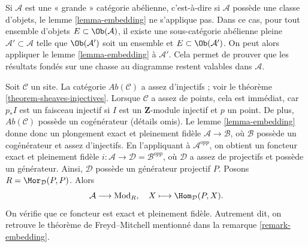 \begin{remark}
\label{remark-embedding-big}
Si $\mathcal{A}$ est une « grande » catégorie abélienne, c'est-à-dire si
$\mathcal{A}$ possède une classe d'objets, le lemme \ref{lemma-embedding} ne
s'applique pas. Dans ce cas, pour tout ensemble d'objets
$E \subset \Ob(\mathcal{A})$, il existe une sous-catégorie abélienne pleine
$\mathcal{A}' \subset \mathcal{A}$ telle que $\Ob(\mathcal{A}')$ soit un
ensemble et $E \subset \Ob(\mathcal{A}')$. On peut alors appliquer le
lemme \ref{lemma-embedding} à $\mathcal{A}'$. Cela permet de prouver que les
résultats fondés sur une chasse au diagramme restent valables dans
$\mathcal{A}$.
\end{remark}

\begin{remark}
\label{remark-embedding-freyd}
Soit $\mathcal{C}$ un site. La catégorie $\textit{Ab}(\mathcal{C})$ a assez
d'injectifs ; voir le théorème \ref{theorem-sheaves-injectives}. Lorsque
$\mathcal{C}$ a assez de points, cela est immédiat, car $p_*I$ est un faisceau
injectif si $I$ est un $\mathbf{Z}$-module injectif et $p$ un point. De plus,
$\textit{Ab}(\mathcal{C})$ possède un cogénérateur (détails omis). Le
lemme \ref{lemma-embedding} donne donc un plongement exact et pleinement fidèle
$\mathcal{A} \to \mathcal{B}$, où $\mathcal{B}$ possède un cogénérateur et
assez d'injectifs. En l'appliquant à $\mathcal{A}^{opp}$, on obtient un foncteur
exact et pleinement fidèle
$i : \mathcal{A} \to \mathcal{D} = \mathcal{B}^{opp}$, où $\mathcal{D}$ a
assez de projectifs et possède un générateur. Ainsi, $\mathcal{D}$ possède un
générateur projectif $P$. Posons $R = \Mor_\mathcal{D}(P, P)$. Alors
$$
\mathcal{A} \longrightarrow \text{Mod}_R, \quad
X \longmapsto \Hom_\mathcal{D}(P, X).
$$
On vérifie que ce foncteur est exact et pleinement fidèle. Autrement dit, on
retrouve le théorème de Freyd--Mitchell mentionné dans la
remarque \ref{remark-embedding}.
\end{remark}

